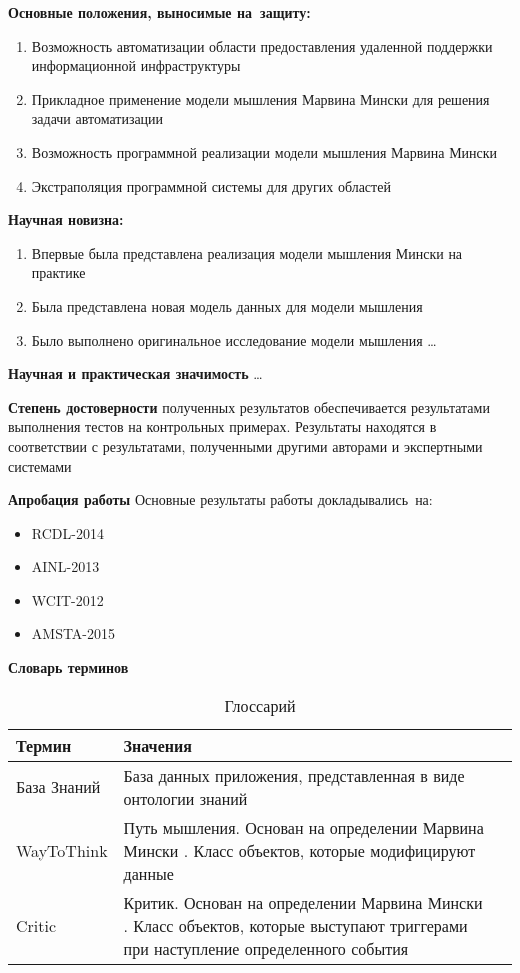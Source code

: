 \textbf{Основные положения, выносимые на~защиту:}
\begin{enumerate}
  \item Возможность автоматизации области предоставления удаленной поддержки информационной инфраструктуры 
  \item Прикладное применение модели мышления Марвина Мински для решения задачи автоматизации
  \item Возможность программной реализации модели мышления Марвина Мински
  \item Экстраполяция программной системы для других областей
\end{enumerate}

\textbf{Научная новизна:}
\begin{enumerate}
  \item Впервые была представлена реализация модели мышления Мински на практике
  \item Была представлена новая модель данных для модели мышления 
  \item Было выполнено оригинальное исследование модели мышления \ldots
\end{enumerate}

\textbf{Научная и практическая значимость} \ldots

\textbf{Степень достоверности} полученных результатов обеспечивается результатами выполнения тестов на контрольных примерах. Результаты находятся в соответствии с результатами, полученными другими авторами и экспертными системами

\textbf{Апробация работы}
Основные результаты работы докладывались~на:
\begin{itemize}
	\item RCDL-2014
	\item AINL-2013
	\item WCIT-2012
	\item AMSTA-2015
\end{itemize}


\textbf{Словарь терминов}
\begin{table} [htbp]
   \centering
   \parbox{15cm}{\caption{Глоссарий}\label{Glossary}}
  \begin{tabular}{| p{5cm} ||p{5cm}|| p{5cm} |}
  \hline
  \hline
Термин & Значения \\
  \hline
  \hline
База Знаний	& База данных приложения, представленная в виде онтологии знаний \\
 \hline
WayToThink	& Путь мышления. Основан на определении Марвина Мински \cite{EmotionMachine}. Класс объектов, которые модифицируют данные \\
 \hline
Critic	& Критик. Основан на определении Марвина Мински \cite{EmotionMachine}. Класс объектов, которые выступают триггерами при наступление определенного события \\

 \hline
  \hline
\end{tabular}
\end{table}

